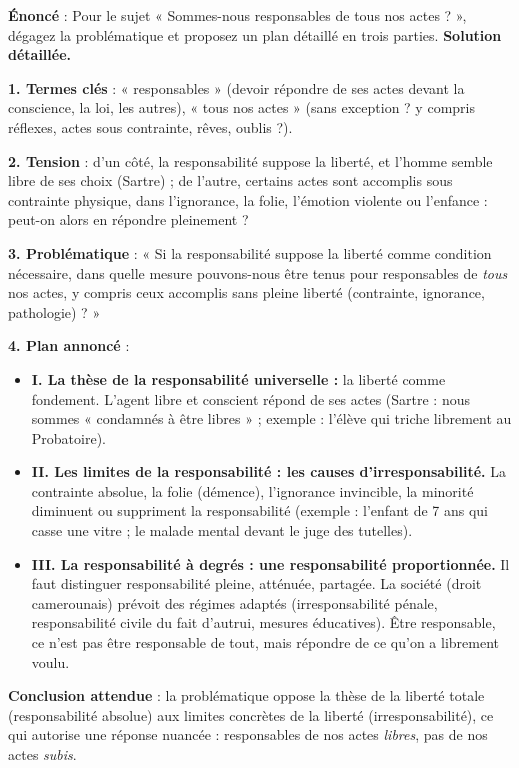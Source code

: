 \documentclass[11pt]{article}
\begin{document}
\begin{exoresolu}
\textbf{Énoncé} : Pour le sujet « Sommes-nous responsables de tous nos actes ? », dégagez la problématique et proposez un plan détaillé en trois parties.
\tcblower
\textbf{Solution détaillée.}

\textbf{1. Termes clés} : « responsables » (devoir répondre de ses actes devant la conscience, la loi, les autres), « tous nos actes » (sans exception ? y compris réflexes, actes sous contrainte, rêves, oublis ?).

\textbf{2. Tension} : d'un côté, la responsabilité suppose la liberté, et l'homme semble libre de ses choix (Sartre) ; de l'autre, certains actes sont accomplis sous contrainte physique, dans l'ignorance, la folie, l'émotion violente ou l'enfance : peut-on alors en répondre pleinement ?

\textbf{3. Problématique} : « Si la responsabilité suppose la liberté comme condition nécessaire, dans quelle mesure pouvons-nous être tenus pour responsables de \emph{tous} nos actes, y compris ceux accomplis sans pleine liberté (contrainte, ignorance, pathologie) ? »

\textbf{4. Plan annoncé} :
\begin{itemize}
\item \textbf{I. La thèse de la responsabilité universelle :} la liberté comme fondement. L'agent libre et conscient répond de ses actes (Sartre : nous sommes « condamnés à être libres » ; exemple : l'élève qui triche librement au Probatoire).
\item \textbf{II. Les limites de la responsabilité : les causes d'irresponsabilité.} La contrainte absolue, la folie (démence), l'ignorance invincible, la minorité diminuent ou suppriment la responsabilité (exemple : l'enfant de 7 ans qui casse une vitre ; le malade mental devant le juge des tutelles).
\item \textbf{III. La responsabilité à degrés : une responsabilité proportionnée.} Il faut distinguer responsabilité pleine, atténuée, partagée. La société (droit camerounais) prévoit des régimes adaptés (irresponsabilité pénale, responsabilité civile du fait d'autrui, mesures éducatives). Être responsable, ce n'est pas être responsable de tout, mais répondre de ce qu'on a librement voulu.
\end{itemize}
\textbf{Conclusion attendue} : la problématique oppose la thèse de la liberté totale (responsabilité absolue) aux limites concrètes de la liberté (irresponsabilité), ce qui autorise une réponse nuancée : responsables de nos actes \emph{libres}, pas de nos actes \emph{subis}.
\end{exoresolu}
\end{document}
